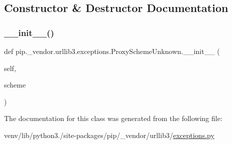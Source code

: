 \subsection{Constructor \& Destructor Documentation}
\mbox{\label{classpip_1_1__vendor_1_1urllib3_1_1exceptions_1_1ProxySchemeUnknown_afa67aa954179522b8055da71bd49c51e}} 
\subsubsection{\texorpdfstring{\+\_\+\+\_\+init\+\_\+\+\_\+()}{\_\_init\_\_()}}
{\footnotesize\ttfamily def pip.\+\_\+vendor.\+urllib3.\+exceptions.\+Proxy\+Scheme\+Unknown.\+\_\+\+\_\+init\+\_\+\+\_\+ (\begin{DoxyParamCaption}\item[{}]{self,  }\item[{}]{scheme }\end{DoxyParamCaption})}



The documentation for this class was generated from the following file\+:\begin{DoxyCompactItemize}
\item 
venv/lib/python3./site-\/packages/pip/\+\_\+vendor/urllib3/\hyperlink{pip_2__vendor_2urllib3_2exceptions_8py}{exceptions.\+py}\end{DoxyCompactItemize}
